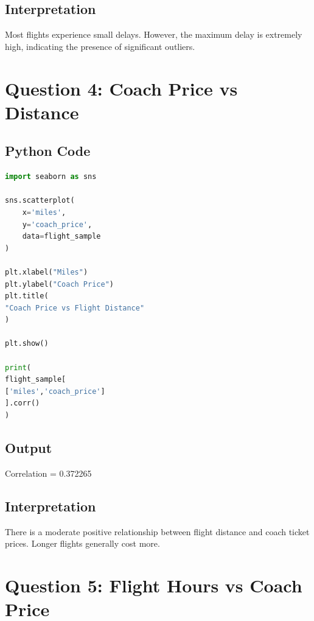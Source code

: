 \documentclass[12pt,a4paper]{article}
\begin{document}
\subsection{Interpretation}

Most flights experience small delays. However, the maximum delay is extremely high, indicating the presence of significant outliers.

\section{Question 4: Coach Price vs Distance}

\subsection{Python Code}

\begin{lstlisting}[language=Python]
import seaborn as sns

sns.scatterplot(
    x='miles',
    y='coach_price',
    data=flight_sample
)

plt.xlabel("Miles")
plt.ylabel("Coach Price")
plt.title(
"Coach Price vs Flight Distance"
)

plt.show()

print(
flight_sample[
['miles','coach_price']
].corr()
)
\end{lstlisting}

\subsection{Output}

\begin{tcolorbox}[colback=lightblue]
Correlation = 0.372265
\end{tcolorbox}

\subsection{Interpretation}

There is a moderate positive relationship between flight distance and coach ticket prices. Longer flights generally cost more.

\section{Question 5: Flight Hours vs Coach Price}
\end{document}
